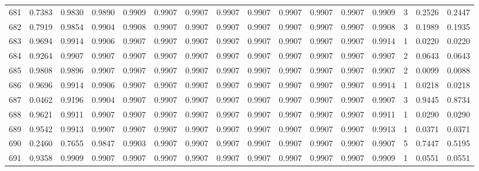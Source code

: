 \begin{tabular}{lrrrrrrrrrrrrrrr}
681 &      0.7383 &  0.9830 &  0.9890 &  0.9909 &  0.9907 &  0.9907 &  0.9907 &  0.9907 &  0.9907 &  0.9907 &   0.9907 &     0.9909 &      3 &                    0.2526 &                     0.2447 \\
682 &      0.7919 &  0.9854 &  0.9904 &  0.9908 &  0.9907 &  0.9907 &  0.9907 &  0.9907 &  0.9907 &  0.9907 &   0.9907 &     0.9908 &      3 &                    0.1989 &                     0.1935 \\
683 &      0.9694 &  0.9914 &  0.9906 &  0.9907 &  0.9907 &  0.9907 &  0.9907 &  0.9907 &  0.9907 &  0.9907 &   0.9907 &     0.9914 &      1 &                    0.0220 &                     0.0220 \\
684 &      0.9264 &  0.9907 &  0.9907 &  0.9907 &  0.9907 &  0.9907 &  0.9907 &  0.9907 &  0.9907 &  0.9907 &   0.9907 &     0.9907 &      2 &                    0.0643 &                     0.0643 \\
685 &      0.9808 &  0.9896 &  0.9907 &  0.9907 &  0.9907 &  0.9907 &  0.9907 &  0.9907 &  0.9907 &  0.9907 &   0.9907 &     0.9907 &      2 &                    0.0099 &                     0.0088 \\
686 &      0.9696 &  0.9914 &  0.9906 &  0.9907 &  0.9907 &  0.9907 &  0.9907 &  0.9907 &  0.9907 &  0.9907 &   0.9907 &     0.9914 &      1 &                    0.0218 &                     0.0218 \\
687 &      0.0462 &  0.9196 &  0.9904 &  0.9907 &  0.9907 &  0.9907 &  0.9907 &  0.9907 &  0.9907 &  0.9907 &   0.9907 &     0.9907 &      3 &                    0.9445 &                     0.8734 \\
688 &      0.9621 &  0.9911 &  0.9907 &  0.9907 &  0.9907 &  0.9907 &  0.9907 &  0.9907 &  0.9907 &  0.9907 &   0.9907 &     0.9911 &      1 &                    0.0290 &                     0.0290 \\
689 &      0.9542 &  0.9913 &  0.9907 &  0.9907 &  0.9907 &  0.9907 &  0.9907 &  0.9907 &  0.9907 &  0.9907 &   0.9907 &     0.9913 &      1 &                    0.0371 &                     0.0371 \\
690 &      0.2460 &  0.7655 &  0.9847 &  0.9903 &  0.9907 &  0.9907 &  0.9907 &  0.9907 &  0.9907 &  0.9907 &   0.9907 &     0.9907 &      5 &                    0.7447 &                     0.5195 \\
691 &      0.9358 &  0.9909 &  0.9907 &  0.9907 &  0.9907 &  0.9907 &  0.9907 &  0.9907 &  0.9907 &  0.9907 &   0.9907 &     0.9909 &      1 &                    0.0551 &                     0.0551 \\

\end{tabular}
